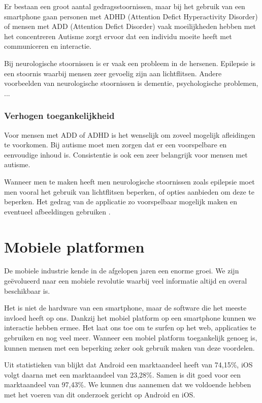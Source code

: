 Er bestaan een groot aantal gedragsstoornissen, maar bij het gebruik van een smartphone gaan personen met ADHD (Attention Defict Hyperactivity Disorder) of mensen met ADD (Attention Defict Disorder) vaak moeilijkheden hebben met het concentreren Autisme zorgt ervoor dat een individu moeite heeft met communiceren en interactie.

Bij neurologische stoornissen is er vaak een probleem in de hersenen. Epilepsie is een stoornis waarbij mensen zeer gevoelig zijn aan lichtflitsen. Andere voorbeelden van neurologische stoornissen is dementie, psychologische problemen, ... 
\autocite{patel2016mental}

\subsubsection{Verhogen toegankelijkheid}
Voor mensen met ADD of ADHD is het wenselijk om zoveel mogelijk afleidingen te voorkomen. Bij autisme moet men zorgen dat er een voorspelbare en eenvoudige inhoud is.  Consistentie is ook een zeer belangrijk voor mensen met autisme.

Wanneer men te maken heeft men neurologische stoornissen zoals epilepsie moet men vooral het gebruik van lichtflitsen beperken, of opties aanbieden om deze te beperken. Het gedrag van de applicatie zo voorspelbaar mogelijk maken en eventueel afbeeldingen gebruiken \autocite{accessibility2019}.



\section{Mobiele platformen}
\label{sec:mobielePlatformen}
De mobiele industrie kende in de afgelopen jaren een enorme groei. We zijn geëvolueerd naar een mobiele revolutie waarbij veel informatie altijd en overal beschikbaar is.

Het is niet de hardware van een smartphone, maar de software die het meeste invloed heeft op ons. Dankzij het mobiel platform op een smartphone kunnen we interactie hebben ermee. Het laat ons toe om te surfen op het web, applicaties te gebruiken en nog veel meer. Wanneer een mobiel platform toegankelijk genoeg is, kunnen mensen met een beperking zeker ook gebruik maken van deze voordelen.


Uit statistieken van \cite{statMobile2019} blijkt dat Android een marktaandeel heeft van 74,15\%, iOS volgt daarna met een marktaandeel van 23,28\%. Samen is dit goed voor een marktaandeel van 97,43\%. We kunnen dus aannemen dat we voldoende hebben met het voeren van dit onderzoek gericht op Android en iOS.

